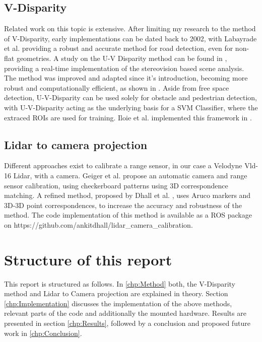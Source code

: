\subsection{V-Disparity}
Related work on this topic is extensive. After limiting my research to the method of V-Disparity, early implementations can be dated back to 2002, with Labayrade et al. \cite{V-disparity_nonflat} providing a robust and accurate method for road detection, even for non-flat geometries. A study on the U-V Disparity method can be found in \cite{Hu2005}, providing a real-time implementation of the stereovision based scene analysis. The method was improved and adapted since it's introduction, becoming more robust and computationally efficient, as shown in \cite{Kakegawa2018}. Aside from free space detection, U-V-Disparity can be used solely for obstacle and pedestrian detection, with U-V-Disparity acting as the underlying basis for a SVM Classifier, where the extraced ROIs are used for training. Iloie et al. implemented this framework in \cite{Iloie2014}.

\subsection{Lidar to camera projection}
Different approaches exist to calibrate a range sensor, in our case a Velodyne Vld-16 Lidar, with a camera. Geiger et al. \cite{Geiger2012} propose an automatic camera and range sensor calibration, using checkerboard patterns using 3D correspondence matching. A refined method, proposed by Dhall et al. \cite{DBLP:journals/corr/DhallCRK17}, uses Aruco markers and 3D-3D point correspondences, to increase the accuracy and robustness of the method. The code implementation of this method is available as a ROS package on https://github.com/ankitdhall/lidar_camera_calibration.

\section{Structure of this report}
This report is structured as follows. In \ref{chp:Method} both, the V-Disparity method and Lidar to Camera projection are explained in theory. Section \ref{chp:Implementation} discusses the implementation of the above methods, relevant parts of the code and additionally the mounted hardware.
Results are presented in section \ref{chp:Results}, followed by a conclusion and proposed future work in \ref{chp:Conclusion}.
